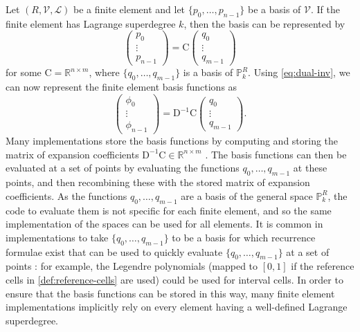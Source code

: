 \documentclass[sn-mathphys-num]{sn-jnl}%
\theoremstyle{thmstyleone}%
\newcommand{\refel}{R}
\newcommand{\polyspace}{\mathcal{V}}
\newcommand{\dualbasis}{\mathcal{L}}
\newcommand{\mat}[1]{\boldsymbol{\mathrm{#1}}}
\newcommand{\inv}{^{-1}}
\theoremstyle{thmstyletwo}%
\theoremstyle{thmstylethree}%
\begin{document}
Let $(\refel,\polyspace,\dualbasis)$ be a finite element
and let $\{p_0,\dots,p_{n-1}\}$ be a basis of $\polyspace$. If the finite element has Lagrange superdegree $k$, then the basis can be represented by
\begin{equation}
\begin{pmatrix}
p_0\\\vdots\\p_{n-1}
\end{pmatrix}
=\mat{C}
\begin{pmatrix}
q_0\\\vdots\\q_{m-1}
\end{pmatrix}
\end{equation}
for some $\mat{C}=\mathbb{R}^{n\times m}$, where $\{q_0,\dots,q_{m-1}\}$ is a basis of $\mathbb{P}^\refel_k$.
Using \cref{eq:dual-inv}, we can now represent the finite element basis functions as
\begin{equation}
\begin{pmatrix}
\phi_0\\\vdots\\\phi_{n-1}
\end{pmatrix}
=
\mat{D}\inv
\mat{C}
\begin{pmatrix}
q_0\\\vdots\\q_{m-1}
\end{pmatrix}.
\end{equation}
Many implementations store the basis functions by computing and storing the matrix of expansion coefficients $\mat{D}\inv\mat{C}\in\mathbb{R}^{n\times m}$
\cite{FIAT,basix,firedrake,fenics-book,dolfinx}.
The basis functions can then be evaluated at a set of points by evaluating the functions $q_0,\dots,q_{m-1}$ at these points, and then
recombining these with the stored matrix of expansion coefficients. As the functions $q_0,\dots,q_{m-1}$ are a basis of the general space $\mathbb{P}^\refel_k$,
the code to evaluate them is not specific for each finite element, and so the same implementation of the spaces can be used for all
elements.
It is common in implementations to take $\{q_0,\dots,q_{m-1}\}$ to be a basis for which recurrence
formulae exist that can be used to quickly evaluate $\{q_0,\dots,q_{m-1}\}$ at a set of points \cite{dubiner1991,spectral/hp,kirby2010singularity}: for example,
the Legendre polynomials (mapped to $[0,1]$ if the reference cells in \cref{def:reference-cells} are used) could be used for interval cells.
In order to ensure that the basis functions can be stored in this way, many finite element implementations implicitly rely on every element having a well-defined Lagrange superdegree.
\end{document}
